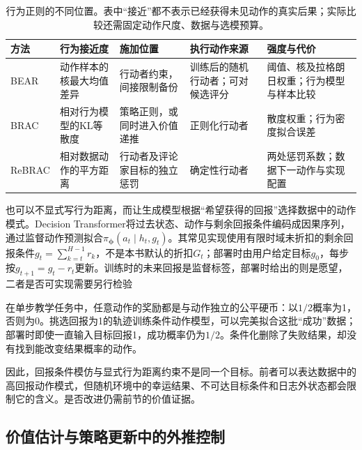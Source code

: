 \begin{table}[t]
  \centering
  \small
  \begin{tabularx}{\linewidth}{p{15mm}XXXX}
    \toprule
    方法 & 行为接近度 & 施加位置 & 执行动作来源 & 强度与代价 \\
    \midrule
    BEAR & 动作样本的核最大均值差异 & 行动者约束，间接限制备份 & 训练后的随机行动者；可对候选评分 & 阈值、核及拉格朗日权重；行为模型与样本比较 \\
    BRAC & 相对行为模型的KL等散度 & 策略正则，或同时进入价值递推 & 正则化行动者 & 散度权重；行为密度拟合误差 \\
    ReBRAC & 相对数据动作的平方距离 & 行动者及评论家目标的独立惩罚 & 确定性行动者 & 两处惩罚系数；数据下一动作与实现配置 \\
    \bottomrule
  \end{tabularx}
  \caption{行为正则的不同位置。表中“接近”都不表示已经获得未见动作的真实后果；实际比较还需固定动作尺度、数据与选模预算。}
  \label{tab:rl-information-behavior-methods}
\end{table}

也可以不显式写行为距离，而让生成模型根据“希望获得的回报”选择数据中的动作模式。Decision Transformer将过去状态、动作与剩余回报条件编码成因果序列，通过监督动作预测拟合$\pi_{\bm\phi}(a_t\mid h_t,g_t)$。其常见实现使用有限时域未折扣的剩余回报条件$g_t=\sum_{k=t}^{H-1}r_k$，不是本书默认的折扣$G_t$；部署时由用户给定目标$g_0$，每步按$g_{t+1}=g_t-r_t$更新。训练时的未来回报是监督标签，部署时给出的则是愿望，二者是否可实现需要另行检验

\begin{example}[回报条件不能控制外部随机结果]
  \label{ex:rl-information-return-conditioning}
  在单步教学任务中，任意动作的奖励都是与动作独立的公平硬币：以$1/2$概率为1，否则为0。挑选回报为1的轨迹训练条件动作模型，可以完美拟合这批“成功”数据；部署时即使一直输入目标回报1，成功概率仍为$1/2$。条件化删除了失败结果，却没有找到能改变结果概率的动作。
\end{example}

因此，回报条件模仿与显式行为距离约束不是同一个目标。前者可以表达数据中的高回报动作模式，但随机环境中的幸运结果、不可达目标条件和日志外状态都会限制它的含义。是否改进仍需前节的价值证据。

\subsection{价值估计与策略更新中的外推控制}
\label{sec:rl-information-pessimism}

